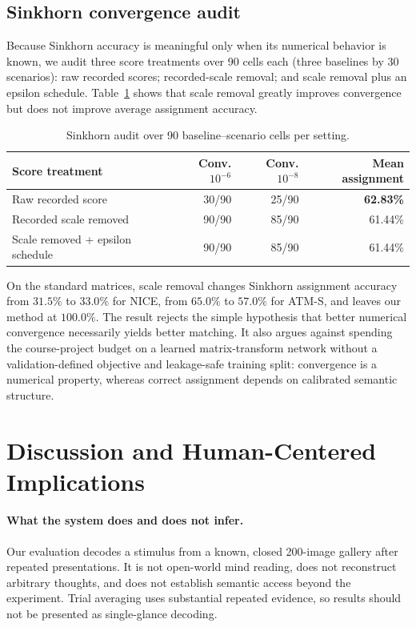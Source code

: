 \documentclass{article}
\begin{document}
\subsection{Sinkhorn convergence audit}

Because Sinkhorn accuracy is meaningful only when its numerical behavior is known, we audit three score treatments over 90 cells each (three baselines by 30 scenarios): raw recorded scores; recorded-scale removal; and scale removal plus an epsilon schedule. Table~\ref{tab:sinkhorn} shows that scale removal greatly improves convergence but does not improve average assignment accuracy.

\begin{table}[t]
\centering
\caption{Sinkhorn audit over 90 baseline--scenario cells per setting.}
\label{tab:sinkhorn}
\begin{tabular}{lrrr}
\toprule
Score treatment & Conv. $10^{-6}$ & Conv. $10^{-8}$ & Mean assignment \\
\midrule
Raw recorded score & 30/90 & 25/90 & \textbf{62.83\%}\\
Recorded scale removed & 90/90 & 85/90 & 61.44\%\\
Scale removed + epsilon schedule & 90/90 & 85/90 & 61.44\%\\
\bottomrule
\end{tabular}
\end{table}

On the standard matrices, scale removal changes Sinkhorn assignment accuracy from $31.5\%$ to $33.0\%$ for NICE, from $65.0\%$ to $57.0\%$ for ATM-S, and leaves our method at $100.0\%$. The result rejects the simple hypothesis that better numerical convergence necessarily yields better matching. It also argues against spending the course-project budget on a learned matrix-transform network without a validation-defined objective and leakage-safe training split: convergence is a numerical property, whereas correct assignment depends on calibrated semantic structure.

\section{Discussion and Human-Centered Implications}
\label{sec:human}

\paragraph{What the system does and does not infer.}
Our evaluation decodes a stimulus from a known, closed 200-image gallery after repeated presentations. It is not open-world mind reading, does not reconstruct arbitrary thoughts, and does not establish semantic access beyond the experiment. Trial averaging uses substantial repeated evidence, so results should not be presented as single-glance decoding.
\end{document}

